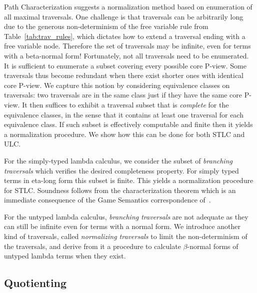 \documentclass{elsarticle}
\theoremstyle{plain}
\theoremstyle{definition}
\theoremstyle{remark}
\begin{document}
Path Characterization suggests a normalization method based on enumeration of all maximal traversals. One challenge is that traversals can be arbitrarily long due to the generous non-determinism of the free variable rule  from Table~\ref{tab:trav_rules}, which dictates how to extend a traversal ending with a free variable node. Therefore the set of traversals may be infinite, even for terms with a beta-normal form! Fortunately, not all traversals need to be enumerated. It is sufficient to enumerate a subset covering every possible core P-view. Some traversals thus become redundant when there exist shorter ones with identical core P-view.
We capture this notion by considering equivalence classes on traversals: two traversals are in the same class just if they have the same core P-view. It then suffices to exhibit a traversal subset that is \emph{complete} for the equivalence classes, in the sense that it contains at least one traversal for each equivalence class. If such subset is effectively computable and finite then it yields a normalization procedure. We show how this can be done for both STLC and ULC.

For the simply-typed lambda calculus, we consider the subset of \emph{branching traversals} which verifies the desired completeness property. For simply typed terms in eta-long form this subset is finite. This yields a normalization procedure for STLC. Soundness follows from the characterization theorem which is an immediate consequence of the Game Semantics correspondence of~\cite{BlumPhd}.

For the untyped lambda calculus, \emph{branching traversals} are not adequate as they can still be infinite even for terms with a normal form. We introduce another kind of traversals, called \emph{normalizing traversals} to limit the non-determinism of the traversals, and derive from it a procedure to calculate $\beta$-normal forms of untyped lambda terms when they exist.

\subsection{Quotienting}
\end{document}

